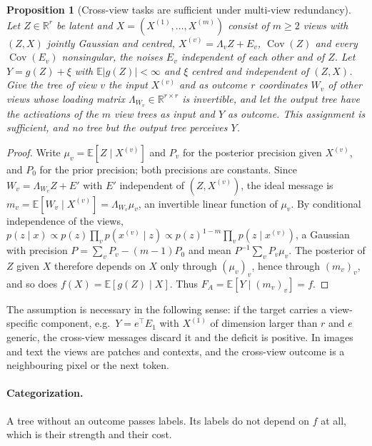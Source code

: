\documentclass[11pt]{article}
\newtheorem{proposition}[theorem]{Proposition}
\theoremstyle{definition}
\theoremstyle{remark}
\newcommand{\R}{\mathbb{R}}
\newcommand{\E}{\mathbb{E}}
\begin{document}
\begin{proposition}[Cross-view tasks are sufficient under multi-view redundancy]\label{prop:multiview}
Let $Z\in\R^r$ be latent and $X=(X^{(1)},\dots,X^{(m)})$ consist of $m\ge2$ views with
$(Z,X)$ jointly Gaussian and centred, $X^{(v)}=\Lambda_vZ+E_v$, $\operatorname{Cov}(Z)$ and
every $\operatorname{Cov}(E_v)$ nonsingular, the noises $E_v$ independent of each other and
of $Z$.  Let $Y=g(Z)+\xi$ with $\E|g(Z)|<\infty$ and $\xi$
centred and independent of $(Z,X)$.  Give the tree of view $v$ the input $X^{(v)}$ and as
outcome $r$ coordinates $W_v$ of other views whose loading matrix $\Lambda_{W_v}\in\R^{r\times r}$
is invertible, and let the output tree have the activations of the $m$ view trees as input
and $Y$ as outcome.  This assignment is sufficient, and no tree but the output tree
perceives $Y$.
\end{proposition}
\begin{proof}
Write $\mu_v=\E[Z\mid X^{(v)}]$ and $P_v$ for the posterior precision given $X^{(v)}$, and
$P_0$ for the prior precision; both precisions are constants.  Since $W_v=\Lambda_{W_v}Z+E'$
with $E'$ independent of $(Z,X^{(v)})$, the ideal message is
$m_v=\E[W_v\mid X^{(v)}]=\Lambda_{W_v}\mu_v$, an invertible linear function of $\mu_v$.
By conditional independence of the views,
$p(z\mid x)\propto p(z)\prod_vp(x^{(v)}\mid z)\propto p(z)^{1-m}\prod_vp(z\mid x^{(v)})$,
a Gaussian with precision $P=\sum_vP_v-(m-1)P_0$ and mean $P^{-1}\sum_vP_v\mu_v$.  The
posterior of $Z$ given $X$ therefore depends on $X$ only through $(\mu_v)_v$, hence through
$(m_v)_v$, and so does $f(X)=\E[g(Z)\mid X]$.  Thus $F_A=\E[Y\mid(m_v)_v]=f$.
\end{proof}

The assumption is necessary in the following sense: if the target carries a
view-specific component, e.g.\ $Y=e^\top E_1$ with $X^{(1)}$ of dimension larger than
$r$ and $e$ generic, the cross-view messages discard it and the deficit is positive.  In images and text the
views are patches and contexts, and the cross-view outcome is a neighbouring pixel or
the next token.

\paragraph{Categorization.}
A tree without an outcome passes labels.  Its labels do not depend on $f$ at all, which
is their strength and their cost.
\end{document}
